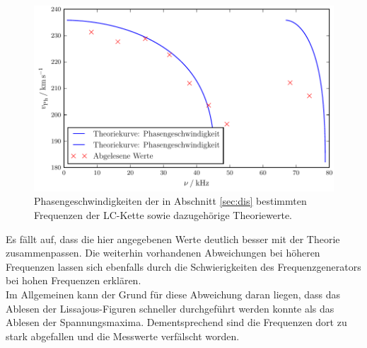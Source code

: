 \begin{figure}[H]
  \centering
  \includegraphics{neu.pdf}
  \caption{Phasengeschwindigkeiten der in Abschnitt \ref{sec:dis} bestimmten Frequenzen der LC-Kette sowie dazugehörige Theoriewerte.}
  \label{fig:neucool}
\end{figure}
Es fällt auf, dass die hier angegebenen Werte deutlich besser mit der Theorie zusammenpassen.
Die weiterhin vorhandenen Abweichungen bei höheren Frequenzen lassen sich ebenfalls durch die Schwierigkeiten des Frequenzgenerators bei hohen Frequenzen erklären.\\
Im Allgemeinen kann der Grund für diese Abweichung daran liegen, dass das Ablesen der Lissajous-Figuren schneller durchgeführt werden konnte als das Ablesen der Spannungsmaxima.
Dementsprechend sind die Frequenzen dort zu stark abgefallen und die Messwerte verfälscht worden.


%
%
%
%
%
